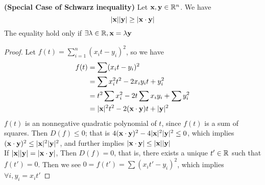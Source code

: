 \documentclass{report}
\begin{document}
\begin{theorem}
\label{1.5.6}
\textbf{(Special Case of Schwarz inequality)}  Let  $\textbf{x},\textbf{y}\in\mathbb{R}^n$. We have  
 \begin{equation}
|\textbf{x}||\textbf{y}|\geq |\textbf{x}\cdot \textbf{y}|
\end{equation}
The equality hold only if $\exists \lambda\in\mathbb{R}, \textbf{x}=\lambda\textbf{y}$
\end{theorem}
\begin{proof}
Let $f(t)=\sum_{i=1}^{n}(x_it-y_i)^2$, so we have
\begin{align}
f(t)&=\sum (x_it-y_i)^2\\
&=\sum x_i^2t^2-2x_iy_it+y_i^2 \\
&=t^2\sum x_i^2 -2t\sum x_iy_i+\sum y_i^2\\
&=|\textbf{x}|^2t^2-2(\textbf{x}\cdot\textbf{y})t+|\textbf{y}|^2
\end{align}
$f(t)$ is an nonnegative quadratic polynomial of $t$, since $f(t)$ is a sum of squares. Then $D(f)\leq 0$; that is $4(\textbf{x}\cdot\textbf{y})^2-4|\textbf{x}|^2|\textbf{y}|^2\leq 0$, which implies $(\textbf{x}\cdot\textbf{y})^2\leq |\textbf{x}|^2|\textbf{y}|^2$, and further implies $|\textbf{x}\cdot \textbf{y}|\leq |\textbf{x}||\textbf{y}|$     \\

If $|\textbf{x}||\textbf{y}|=|\textbf{x}\cdot\textbf{y}|$, Then $D(f)=0$, that is, there exists a unique $t'\in\mathbb{R}$ such that $f(t')=0$. Then we see $0=f(t')=\sum (x_it'-y_i)^2$, which implies $\forall i, y_i=x_it'$
\end{proof}
\renewcommand{\inC}{\in\C}
\end{document}
